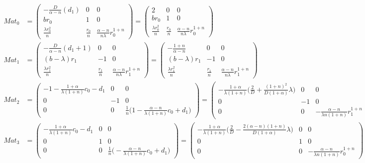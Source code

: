 \documentclass[a4paper,11pt]{article}
\begin{document}
\begin{align*}
 Mat_0 &= \begin{pmatrix}
          -\frac{D}{\alpha-n}(d_1) & 0 & 0\\
          br_0 & 1 & 0\\
          \frac{\lambda r_0^2}{n} & \frac{r_0}{n} & \frac{\alpha-n}{n\lambda}r_0^{1+n}
         \end{pmatrix}
        = \begin{pmatrix}
          2 & 0 & 0\\
          br_0 & 1 & 0\\
          \frac{\lambda r_0^2}{n} & \frac{r_0}{n} & \frac{\alpha-n}{n\lambda}r_0^{1+n}
         \end{pmatrix}\\
 Mat_1 &= \begin{pmatrix}
          -\frac{D}{\alpha-n}(d_1+1) & 0 & 0\\
          (b-\lambda)r_1 & -1 & 0\\
          \frac{\lambda r_1^2}{n} & \frac{r_1}{n} & \frac{\alpha-n}{n\lambda}r_1^{1+n}
         \end{pmatrix}
        =\begin{pmatrix}
          -\frac{1+n}{\alpha-n} & 0 & 0\\
          (b-\lambda)r_1 & -1 & 0\\
          \frac{\lambda r_1^2}{n} & \frac{r_1}{n} & \frac{\alpha-n}{n\lambda}r_1^{1+n}
         \end{pmatrix}\\
 Mat_2 &= \begin{pmatrix}
	  -1-\frac{1+\alpha}{\lambda(1+n)} c_0 -d_1 & 0 & 0\\
	  0 & -1 & 0\\
	  0 & 0 & \frac{1}{n}\Big(1-\frac{\alpha-n}{\lambda(1+n)} c_0 +d_1\Big)
         \end{pmatrix}
        = \begin{pmatrix}
	  -\frac{1+\alpha}{\lambda(1+n)} \Big(\frac{2}{D} + \frac{(1+n)^2}{D(1+\alpha)}\lambda\Big) & 0 & 0\\
	  0 & -1 & 0\\
	  0 & 0 & -\frac{\alpha-n}{\lambda n(1+n)}r_1^{1+n}
         \end{pmatrix}\\
 Mat_3 &= \begin{pmatrix}
	  -\frac{1+\alpha}{\lambda(1+n)} c_0 -d_1 & 0 & 0\\
	  0 & 1 & 0\\
	  0 & 0 & \frac{1}{n}\Big(-\frac{\alpha-n}{\lambda(1+n)} c_0 +d_1\Big)
         \end{pmatrix}
	=\begin{pmatrix}
	  -\frac{1+\alpha}{\lambda(1+n)} \Big(\frac{2}{D} - \frac{2(\alpha-n)(1+n)}{D(1+\alpha)}\lambda\Big)& 0 & 0\\
	  0 & 1 & 0\\
	  0 & 0 & -\frac{\alpha-n}{\lambda n(1+n)}r_0^{1+n}
         \end{pmatrix}
\end{align*}
\end{document}
